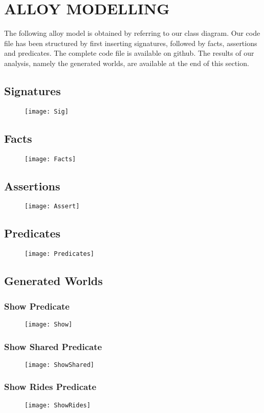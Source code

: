 
\section{ALLOY MODELLING} 
The following alloy model is obtained by referring to our class diagram. Our code file has been structured by first inserting signatures, followed by facts, assertions and predicates.
The complete code file is available on github. The results of our analysis, namely the generated worlds, are available at the end of this section.

\subsection{Signatures}
\begin{figure}[h!]
	\centering
	\texttt{[image: Sig]}
\end{figure}

\newpage

\subsection{Facts}
\begin{figure}[h!]
	\centering
	\texttt{[image: Facts]}
\end{figure}

\newpage
\subsection{Assertions}
\begin{figure}[h!]
	\centering
	\texttt{[image: Assert]}
\end{figure}

\newpage
\subsection{Predicates}
\begin{figure}[h!]
	\centering
	\texttt{[image: Predicates]}
\end{figure}

\newpage

\subsection{Generated Worlds}
\subsubsection{Show Predicate}
\begin{figure}[h!]
	\texttt{[image: Show]}
\end{figure}
\newpage

\subsubsection{Show Shared Predicate}

\begin{figure}[h!]
	\texttt{[image: ShowShared]}
\end{figure}
\newpage

\subsubsection{Show Rides Predicate}
\begin{figure}[h!]
	\texttt{[image: ShowRides]}
\end{figure}
\newpage
